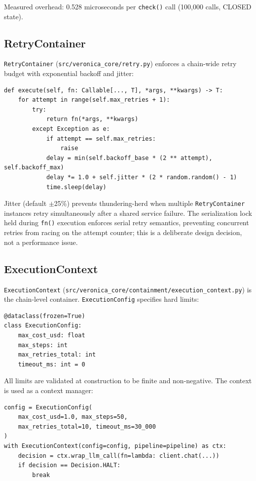 \documentclass[11pt]{article}
\begin{document}
Measured overhead: 0.528 microseconds per \texttt{check()} call (100,000
calls, CLOSED state).

\subsection{RetryContainer}

\texttt{RetryContainer} (\texttt{src/veronica\_core/retry.py}) enforces a
chain-wide retry budget with exponential backoff and jitter:

\begin{lstlisting}
def execute(self, fn: Callable[..., T], *args, **kwargs) -> T:
    for attempt in range(self.max_retries + 1):
        try:
            return fn(*args, **kwargs)
        except Exception as e:
            if attempt == self.max_retries:
                raise
            delay = min(self.backoff_base * (2 ** attempt), self.backoff_max)
            delay *= 1.0 + self.jitter * (2 * random.random() - 1)
            time.sleep(delay)
\end{lstlisting}

Jitter (default $\pm$25\%) prevents thundering-herd when multiple
\texttt{RetryContainer} instances retry simultaneously after a shared service
failure. The serialization lock held during \texttt{fn()} execution enforces
serial retry semantics, preventing concurrent retries from racing on the
attempt counter; this is a deliberate design decision, not a performance
issue.

\subsection{ExecutionContext}

\texttt{ExecutionContext}
(\texttt{src/veronica\_core/containment/execution\_context.py}) is the
chain-level container. \texttt{ExecutionConfig} specifies hard limits:

\begin{lstlisting}
@dataclass(frozen=True)
class ExecutionConfig:
    max_cost_usd: float
    max_steps: int
    max_retries_total: int
    timeout_ms: int = 0
\end{lstlisting}

All limits are validated at construction to be finite and non-negative. The
context is used as a context manager:

\begin{lstlisting}
config = ExecutionConfig(
    max_cost_usd=1.0, max_steps=50,
    max_retries_total=10, timeout_ms=30_000
)
with ExecutionContext(config=config, pipeline=pipeline) as ctx:
    decision = ctx.wrap_llm_call(fn=lambda: client.chat(...))
    if decision == Decision.HALT:
        break
\end{lstlisting}
\end{document}
